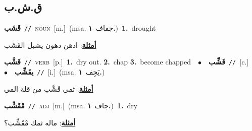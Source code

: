 \documentclass[10pt,a4paper,twoside]{article} %
\begin{document}
\begin{multicols}{2}
\vspace{-3mm}
\subsection*{\color{blue}\foreignlanguage{arabic}{ق.ش.ب}\color{blue}{}} 

{\setlength\topsep{0pt}\textbf{\foreignlanguage{arabic}{قَشَب}}\ {\color{gray}\texttt{//}\color{black}}\ \textsc{noun}\ [m.]\ \color{gray}(msa. \foreignlanguage{arabic}{جفاف}~\foreignlanguage{arabic}{\textbf{١.}})\color{black}\ \textbf{1.}~drought\  \begin{flushright}\color{gray}\foreignlanguage{arabic}{\textbf{\underline{\foreignlanguage{arabic}{أمثلة}}}: ادهن دهون يشبل القَشَب}\end{flushright}\color{black}} \vspace{2mm}

{\setlength\topsep{0pt}\textbf{\foreignlanguage{arabic}{قَشَّب}}\ {\color{gray}\texttt{//}\color{black}}\ \textsc{verb}\ [p.]\ \textbf{1.}~dry out.  \textbf{2.}~chap  \textbf{3.}~become chapped\ \ $\bullet$\ \ \setlength\topsep{0pt}\textbf{\foreignlanguage{arabic}{قَشِّب}}\ {\color{gray}\texttt{//}\color{black}}\ [c.]\ \ $\bullet$\ \ \setlength\topsep{0pt}\textbf{\foreignlanguage{arabic}{يقَشِّب}}\ {\color{gray}\texttt{//}\color{black}}\ [i.]\ \color{gray}(msa. \foreignlanguage{arabic}{يَجِف}~\foreignlanguage{arabic}{\textbf{١.}})\color{black}\  \begin{flushright}\color{gray}\foreignlanguage{arabic}{\textbf{\underline{\foreignlanguage{arabic}{أمثلة}}}: ثمي قَشَّب من قلة المي}\end{flushright}\color{black}} \vspace{2mm}

{\setlength\topsep{0pt}\textbf{\foreignlanguage{arabic}{مْقَشِّب}}\ {\color{gray}\texttt{//}\color{black}}\ \textsc{adj}\ [m.]\ \color{gray}(msa. \foreignlanguage{arabic}{جاف}~\foreignlanguage{arabic}{\textbf{١.}})\color{black}\ \textbf{1.}~dry\  \begin{flushright}\color{gray}\foreignlanguage{arabic}{\textbf{\underline{\foreignlanguage{arabic}{أمثلة}}}: ماله ثمك مْقَشِّب؟}\end{flushright}\color{black}} \vspace{2mm}


\end{multicols}
\end{document}
